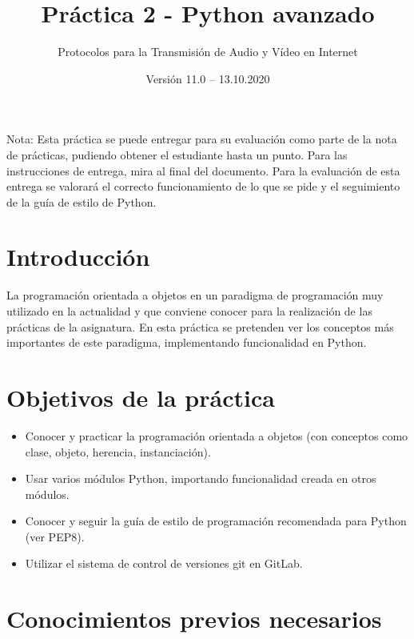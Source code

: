 \documentclass[11pt,a4paper]{article}
\begin{document}
\title{Práctica 2 - Python avanzado}
\author{Protocolos para la Transmisión de Audio y Vídeo en Internet}
\date{Versión 11.0 – 13.10.2020}


\maketitle


Nota: Esta práctica se puede entregar para su evaluación como parte de la nota de prácticas, pudiendo obtener el estudiante hasta un punto. Para las instrucciones de entrega, mira al final del documento. Para la evaluación de esta entrega se valorará el correcto funcionamiento de lo que se pide y el seguimiento de la guía de estilo de Python.

\section{Introducción}

La programación orientada a objetos en un paradigma de programación muy utilizado en la actualidad y que conviene conocer para la realización de las prácticas de la asignatura. En esta práctica se pretenden ver los conceptos más importantes de este paradigma, implementando funcionalidad en Python.


\section{Objetivos de la práctica}

\begin{itemize}
  \item Conocer y practicar la programación orientada a objetos (con conceptos como clase, objeto, herencia, instanciación).
  \item Usar varios módulos Python, importando funcionalidad creada en otros módulos.
  \item Conocer y seguir la guía de estilo de programación recomendada para Python (ver PEP8).
  \item Utilizar el sistema de control de versiones git en GitLab.
\end{itemize}

\section{Conocimientos previos necesarios}
\end{document}
